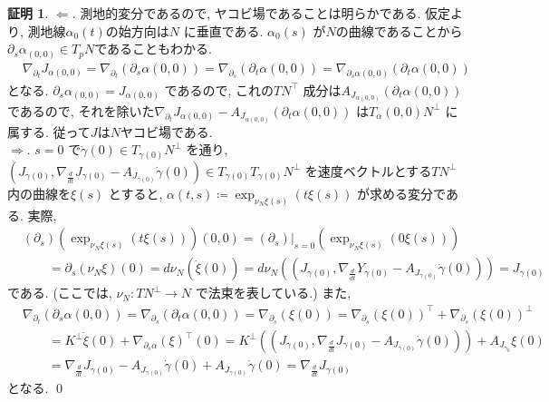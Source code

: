 \documentclass[twocolumn, landscape, a4paper , 8pt, fleqn, titlepage ]{jsarticle}
\theoremstyle{definition}
\newtheorem*{pf*}{証明}
\newcommand{\naraba}{\Rightarrow}
\newcommand{\gyaku}{\Leftarrow}
\renewcommand{\-}{\hyphen}
\begin{document}
\begin{pf*}
$\gyaku.$ 測地的変分であるので, ヤコビ場であることは明らかである. 仮定より, 測地線$\alpha_0 (t)$の始方向は$N$ に垂直である. $\alpha_0(s)$ が$N$の曲線であることから$\partial_s \alpha_(0,0) \in T_p N$であることもわかる. 
\begin{align*} &\nabla_{\partial_t} J_{\alpha{(0,0)} } = \nabla_{\partial_t} (\partial_s \alpha(0,0)) = \nabla_{\partial_s} (\partial_t \alpha(0,0)) = \nabla_{\partial_s \alpha{(0,0)} } (\partial_t \alpha(0,0)) \end{align*}
となる.  $\partial_s \alpha_{(0,0)} = J_{\alpha(0,0)}$ であるので, これの$TN^ \top$ 成分は$A_{J_{\alpha(0,0)}} (\partial_t \alpha(0,0))$ であるので, それを除いた$\nabla_{\partial_t} J_{\alpha{(0,0)} } - A_{J_{\alpha(0,0)}} (\partial_t \alpha(0,0))$ は$T_\alpha(0,0) N^\perp$ に属する. 従って$J$は$N$ヤコビ場である. \\
$\naraba.$ $s = 0$ で$\dot \gamma(0) \in T_{\gamma(0)} N^\perp  $ を通り, $(J_{\gamma(0)}, \nabla_{\frac{d}{dt} } J_{\gamma (0) } - A_{J_{\gamma(0)} } \dot \gamma (0)  ) \in T_{\dot \gamma(0) } T_{\gamma(0) }N ^\perp$ を速度ベクトルとする$TN^\perp$ 内の曲線を$\xi (s)$ とすると, $\alpha (t,s) \coloneqq \exp_{\nu_N  \xi (s) } (t \xi (s))$ が求める変分である. 実際, 
\begin{align*} &(\partial_s)(\exp_{\nu_N  \xi (s) } (t \xi (s))) (0, 0) = (\partial_s)|_{s = 0} (\exp_{\nu_N  \xi (s) } (0 \xi (s))) \\ &\quad \quad = \partial_s (\nu_N \xi) (0) = d\nu_N (\dot \xi (0) ) = d \nu_N ( (J_{\gamma(0)}, \nabla_{\frac{d}{dt} } Y_{\gamma (0) } - A_{J_{\gamma(0)} } \dot \gamma (0)  ) ) = J_{\gamma(0)} \end{align*}
である. (ここでは, $\nu_N: TN^\perp \rightarrow N$ で法束を表している.) また, 
\begin{align*} &\nabla_{\partial_t} (\partial_s \alpha (0,0)) = \nabla_{\partial_s} (\partial_t \alpha (0,0)) = \nabla_{\partial_s} (\xi (0)) = \nabla_{\partial_s} (\xi (0)) ^\top + \nabla_{\partial_s} (\xi (0)) ^\perp \\&\quad \quad  = K^\perp  \dot \xi (0) + \nabla_{\partial_s \alpha } (\xi) ^\top (0) = K^\perp ( (J_{\gamma(0)}, \nabla_{\frac{d}{dt} } J_{\gamma (0) } - A_{J_{\gamma(0)} } \dot \gamma (0)  ) ) + A_{J_{\gamma_0}} \xi (0) \\& \quad \quad =  \nabla_{\frac{d}{dt} } J_{\gamma (0) } - A_{J_{\gamma(0)} } \dot \gamma (0)  +  A_{J_{\gamma(0)} } \dot \gamma (0) = \nabla_{\frac{d}{dt} } J_{\gamma (0) }  \end{align*}
となる.  
\qed
\end{pf*}
\end{document}
